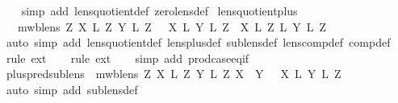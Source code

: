 \begin{isabellebody}
%
\isadelimproof
\ \ %
\endisadelimproof
%
\isatagproof
{}\isamarkupfalse%
\ {\isacharparenleft}simp\ add{\isacharcolon}\ lens{\isacharunderscore}quotient{\isacharunderscore}def\ zero{\isacharunderscore}lens{\isacharunderscore}def{\isacharparenright}%
\endisatagproof
{\isafoldproof}%
%
\isadelimproof
\isanewline
%
\endisadelimproof
\isanewline
{}\isamarkupfalse%
\ lens{\isacharunderscore}quotient{\isacharunderscore}plus{\isacharcolon}\isanewline
\ \ {\isachardoublequoteopen}{\isasymlbrakk}\ mwb{\isacharunderscore}lens\ Z{\isacharsemicolon}\ X\ {\isasymsubseteq}\isactrlsub L\ Z{\isacharsemicolon}\ Y\ {\isasymsubseteq}\isactrlsub L\ Z\ {\isasymrbrakk}\ {\isasymLongrightarrow}\ {\isacharparenleft}X\ {\isacharplus}\isactrlsub L\ Y{\isacharparenright}\ {\isacharslash}\isactrlsub L\ Z\ {\isacharequal}\ {\isacharparenleft}X\ {\isacharslash}\isactrlsub L\ Z{\isacharparenright}\ {\isacharplus}\isactrlsub L\ {\isacharparenleft}Y\ {\isacharslash}\isactrlsub L\ Z{\isacharparenright}{\isachardoublequoteclose}\isanewline
%
\isadelimproof
\ \ %
\endisadelimproof
%
\isatagproof
{}\isamarkupfalse%
\ {\isacharparenleft}auto\ simp\ add{\isacharcolon}\ lens{\isacharunderscore}quotient{\isacharunderscore}def\ lens{\isacharunderscore}plus{\isacharunderscore}def\ sublens{\isacharunderscore}def\ lens{\isacharunderscore}comp{\isacharunderscore}def\ comp{\isacharunderscore}def{\isacharparenright}\isanewline
\ \ \isamarkupfalse%
\ {\isacharparenleft}rule\ ext{\isacharparenright}\isanewline
\ \ \isamarkupfalse%
\ {\isacharparenleft}rule\ ext{\isacharparenright}\isanewline
\ \ \isamarkupfalse%
\ {\isacharparenleft}simp\ add{\isacharcolon}\ prod{\isachardot}case{\isacharunderscore}eq{\isacharunderscore}if{\isacharparenright}\isanewline
{}\isamarkupfalse%
%
\endisatagproof
{\isafoldproof}%
%
\isadelimproof
\isanewline
%
\endisadelimproof
\isanewline
{}\isamarkupfalse%
\ plus{\isacharunderscore}pred{\isacharunderscore}sublens{\isacharcolon}\ {\isachardoublequoteopen}{\isasymlbrakk}\ mwb{\isacharunderscore}lens\ Z{\isacharsemicolon}\ X\ {\isasymsubseteq}\isactrlsub L\ Z{\isacharsemicolon}\ Y\ {\isasymsubseteq}\isactrlsub L\ Z{\isacharsemicolon}\ X\ {\isasymbowtie}\ Y\ {\isasymrbrakk}\ {\isasymLongrightarrow}\ {\isacharparenleft}X\ {\isacharplus}\isactrlsub L\ Y{\isacharparenright}\ {\isasymsubseteq}\isactrlsub L\ Z{\isachardoublequoteclose}\isanewline
%
\isadelimproof
\ \ %
\endisadelimproof
%
\isatagproof
{}\isamarkupfalse%
\ {\isacharparenleft}auto\ simp\ add{\isacharcolon}\ sublens{\isacharunderscore}def{\isacharparenright}\isanewline

\end{isabellebody}
